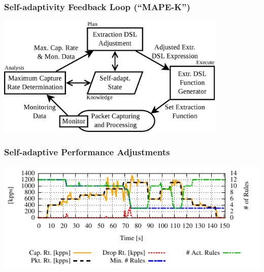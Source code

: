 \documentclass[aspectratio=169]{beamer}
\begin{document}
\begin{frame}
    \frametitle{Self-adaptivity Feedback Loop (``MAPE-K'')}
    \begin{center}
        \includegraphics[width=11cm]{images/control_loop_overview}
    \end{center}
\end{frame}



\begin{frame}
    \frametitle{Self-adaptive Performance Adjustments}
    \begin{center}
        \includegraphics[width=\linewidth]{images/sa_test_66}
    \end{center}
\end{frame}
\end{document}
